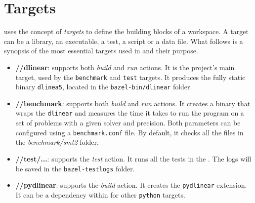 

\section{Targets}

\bazel uses the concept of \textit{targets} to define the building blocks of a workspace.
A target can be a library, an executable, a test, a script or a data file.
What follows is a synopsis of the most essential targets used in \dlinear and their purpose.

\begin{itemize}
        \item \textbf{//dlinear}: supports both \textit{build} and \textit{run} actions.
              It is the project's main target, used by the \texttt{benchmark} and \texttt{test} targets.
              It produces the fully static binary \texttt{dlinea5}, located in the \texttt{bazel-bin/dlinear} folder.
        \item \textbf{//benchmark}: supports both \textit{build} and \textit{run} actions.
              It creates a binary that wraps the \texttt{dlinear} and measures the time it takes to run the program on a set of problems with a given solver and precision.
              Both parameters can be configured using a \texttt{benchmark.conf} file.
              By default, it checks all the files in the \textit{benchmark/smt2} folder.
        \item \textbf{//test/...}: supports the \textit{test} action.
              It runs all the tests in the \dlinear.
              The logs will be saved in the \texttt{bazel-testlogs} folder.
        \item \textbf{//pydlinear}: supports the \textit{build} action.
              It creates the \texttt{pydlinear} extension.
              It can be a dependency within \bazel for other \texttt{python} targets.
\end{itemize}
